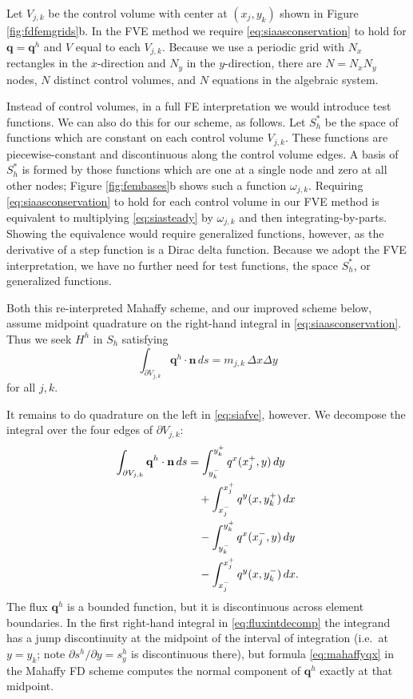 \documentclass[twocolumn,letterpaper]{igs}
\newcommand\bn{\mathbf{n}}
\newcommand\bq{\mathbf{q}}
\begin{document}
Let $V_{j,k}$ be the control volume with center at $(x_j,y_k)$ shown in Figure \ref{fig:fdfemgrids}b.  In the FVE method we require \eqref{eq:siaasconservation} to hold for $\bq=\bq^h$ and $V$ equal to each $V_{j,k}$.  Because we use a periodic grid with $N_x$ rectangles in the $x$-direction and $N_y$ in the $y$-direction, there are $N=N_xN_y$ nodes, $N$ distinct control volumes, and $N$ equations in the algebraic system.

Instead of control volumes, in a full FE interpretation we would introduce test functions.  We can also do this for our scheme, as follows.  Let $S_h^*$ be the space of functions which are constant on each control volume $V_{j,k}$.  These functions are piecewise-constant and discontinuous along the control volume edges.  A basis of $S_h^*$ is formed by those functions which are one at a single node and zero at all other nodes; Figure \ref{fig:fembases}b shows such a function $\omega_{j,k}$.  Requiring \eqref{eq:siaasconservation} to hold for each control volume in our FVE method is equivalent to multiplying \eqref{eq:siasteady} by $\omega_{j,k}$ and then integrating-by-parts.  Showing the equivalence would require generalized functions, however, as the derivative of a step function is a Dirac delta function.  Because we adopt the FVE interpretation, we have no further need for test functions, the space $S_h^*$, or generalized functions.

Both this re-interpreted Mahaffy scheme, and our improved scheme below, assume midpoint quadrature on the right-hand integral in \eqref{eq:siaasconservation}.  Thus we seek $H^h$ in $S_h$ satisfying
\begin{equation}
  \int_{\partial V_{j,k}} \bq^h \cdot \bn\,ds = m_{j,k}\, \Delta x \Delta y \label{eq:siafve}
\end{equation}
for all $j,k$.

It remains to do quadrature on the left in \eqref{eq:siafve}, however.  We decompose the integral over the four edges of $\partial V_{j,k}$:
\begin{align}
\int_{\partial V_{j,k}} \bq^h \cdot \bn\,ds &= \int_{y_k^-}^{y_k^+} q^x(x_j^+,y)\,dy \label{eq:fluxintdecomp} \\
&\quad + \int_{x_j^-}^{x_j^+} q^y(x,y_k^+)\,dx \notag \\
&\quad - \int_{y_k^-}^{y_k^+} q^x(x_j^-,y)\,dy \notag \\
&\quad - \int_{x_j^-}^{x_j^+} q^y(x,y_k^-)\,dx. \notag
\end{align}
The flux $\bq^h$ is a bounded function, but it is discontinuous across element boundaries.  In the first right-hand integral in \eqref{eq:fluxintdecomp} the integrand has a jump discontinuity at the midpoint of the interval of integration (i.e.~at $y=y_k$; note $\partial s^h/\partial y = s^h_y$ is discontinuous there), but formula \eqref{eq:mahaffyqx} in the Mahaffy FD scheme computes the normal component of $\bq^h$ exactly at that midpoint.
\end{document}
